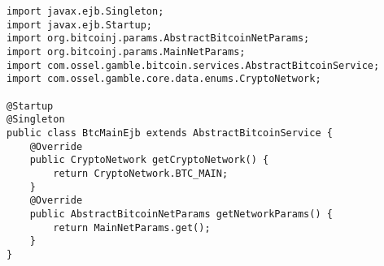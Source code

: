 \begin{lstlisting}[basicstyle=\small] %or \tiny or \small or \footnotesize etc.
import javax.ejb.Singleton;
import javax.ejb.Startup;
import org.bitcoinj.params.AbstractBitcoinNetParams;
import org.bitcoinj.params.MainNetParams;
import com.ossel.gamble.bitcoin.services.AbstractBitcoinService;
import com.ossel.gamble.core.data.enums.CryptoNetwork;

@Startup
@Singleton
public class BtcMainEjb extends AbstractBitcoinService {
    @Override
    public CryptoNetwork getCryptoNetwork() {
        return CryptoNetwork.BTC_MAIN;
    }
    @Override
    public AbstractBitcoinNetParams getNetworkParams() {
        return MainNetParams.get();
    }
}
\end{lstlisting}

